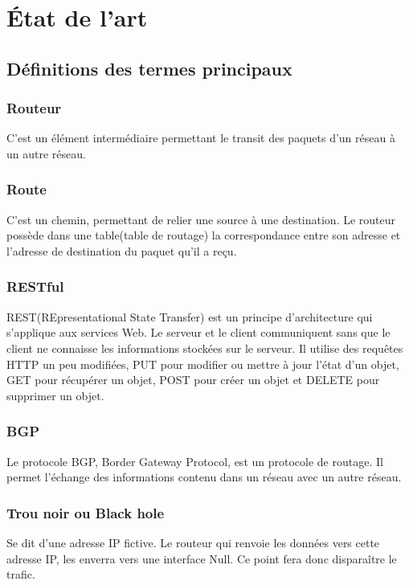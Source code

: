 \chapter{État de l'art}

\section{Définitions des termes principaux}

\subsection{Routeur}
C'est un élément intermédiaire permettant le transit des paquets d'un réseau à un autre réseau.

\subsection{Route}
C'est un chemin, permettant de relier une source à une destination. Le routeur possède dans une table(table de routage) la correspondance entre son adresse et l'adresse de destination du paquet qu'il a reçu.

\subsection{RESTful}
REST(REpresentational State Transfer) est un principe d'architecture qui s'applique aux services Web. Le serveur et le client communiquent sans que le client ne connaisse les informations stockées sur le serveur. Il utilise des requêtes HTTP un peu modifiées, PUT pour modifier ou mettre à jour l'état d'un objet, GET pour récupérer un objet, POST pour créer un objet et DELETE pour supprimer un objet.

\subsection{BGP}
Le protocole BGP, Border Gateway Protocol, est un protocole de routage. Il permet l'échange des informations contenu dans un réseau avec un autre réseau.

\subsection{Trou noir ou Black hole}
Se dit d'une adresse IP fictive. Le routeur qui renvoie les données vers cette adresse IP, les enverra vers une interface Null. Ce point fera donc disparaître le trafic.


